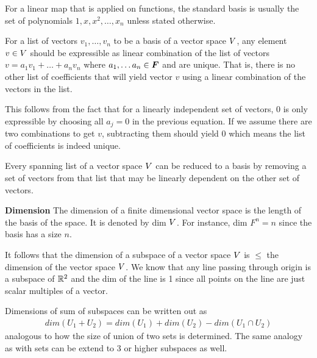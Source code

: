 \documentclass[../../linear_algebra.tex]{subfiles}
\begin{document}
For a linear map that is applied on functions, the standard basis is usually the set of polynomials $1, x, x^{2}, \ldots, x_{n}$ unless stated otherwise.\newline

For a list of vectors $v_{1}, \ldots, v_{n}$ to be a basis of a vector space $V$, any element $v \in V$ should be expressible as linear combination of the list of vectors $v = a_{1}v_{1} + \ldots + a_{n}v_{n}$ where $a_{1}, \ldots a_{n} \in \bm{F}$ and are unique. That is, there is no other list of coefficients that will yield vector $v$ using a linear combination of the vectors in the list.\newline

This follows from the fact that for a linearly independent set of vectors, $0$ is only expressible by choosing all $a_{j} = 0$ in the previous equation. If we assume there are two combinations to get $v$, subtracting them should yield $0$ which means the list of coefficients is indeed unique.\newline

Every spanning list of a vector space $V$ can be reduced to a basis by removing a set of vectors from that list that may be linearly dependent on the other set of vectors.\newline

\textbf{Dimension}\newline
The dimension of a finite dimensional vector space is the length of the basis of the space. It is denoted by dim $V$. For instance, dim $F^{n} = n$ since the basis has a size $n$.\newline

It follows that the dimension of a subspace of a vector space $V$ is $\leq$ the dimension of the vector space $V$. We know that any line passing through origin is a subspace of $\mathbb{R}^{2}$ and the dim of the line is 1 since all points on the line are just scalar multiples of a vector.\newline

Dimensions of sum of subspaces can be written out as
\begin{align*}
    dim(U_{1} + U_{2}) = dim(U_{1}) + dim(U_{2}) - dim(U_{1} \cap U_{2})
\end{align*}
analogous to how the size of union of two sets is determined. The same analogy as with sets can be extend to 3 or higher subspaces as well.
\end{document}
